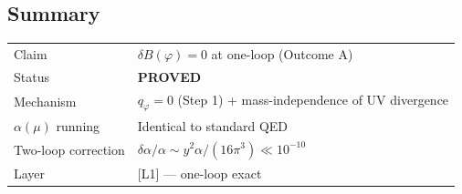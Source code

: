 \documentclass[12pt]{article}
\theoremstyle{definition}
\theoremstyle{remark}
\begin{document}
\subsection{Summary}

\begin{center}
\begin{tabular}{ll}
\hline
Claim & $\delta B(\varphi) = 0$ at one-loop (Outcome A) \\
Status & \textbf{PROVED} \\
Mechanism & $q_\varphi = 0$ (Step 1) + mass-independence of UV divergence \\
$\alpha(\mu)$ running & Identical to standard QED \\
Two-loop correction & $\delta\alpha/\alpha \sim y^2\alpha/(16\pi^3) \ll 10^{-10}$ \\
Layer & [L1] — one-loop exact \\
\hline
\end{tabular}
\end{center}

\ifdefined\INCLUDEMODE\else
  
\end{document}
